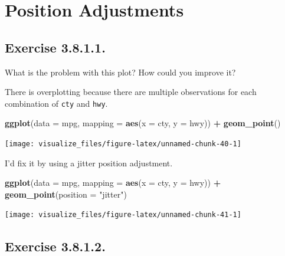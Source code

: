 \documentclass[]{book}
\newenvironment{Shaded}{\begin{snugshade}}{\end{snugshade}}
\newcommand{\DataTypeTok}[1]{\textcolor[rgb]{0.13,0.29,0.53}{#1}}
\newcommand{\KeywordTok}[1]{\textcolor[rgb]{0.13,0.29,0.53}{\textbf{#1}}}
\newcommand{\NormalTok}[1]{#1}
\newcommand{\OperatorTok}[1]{\textcolor[rgb]{0.81,0.36,0.00}{\textbf{#1}}}
\newcommand{\StringTok}[1]{\textcolor[rgb]{0.31,0.60,0.02}{#1}}
\theoremstyle{plain}
\theoremstyle{remark}
\begin{document}
\hypertarget{position-adjustments}{%
\section{Position Adjustments}\label{position-adjustments}}

\hypertarget{exercise-3.8.1.1.}{%
\subsection*{\texorpdfstring{Exercise {3.8.1.1}.}{Exercise 3.8.1.1.}}\label{exercise-3.8.1.1.}}

What is the problem with this plot?
How could you improve it?

There is overplotting because there are multiple observations for each combination of \texttt{cty} and \texttt{hwy}.

\begin{Shaded}
\begin{Highlighting}[]
\KeywordTok{ggplot}\NormalTok{(}\DataTypeTok{data =}\NormalTok{ mpg, }\DataTypeTok{mapping =} \KeywordTok{aes}\NormalTok{(}\DataTypeTok{x =}\NormalTok{ cty, }\DataTypeTok{y =}\NormalTok{ hwy)) }\OperatorTok{+}
\StringTok{  }\KeywordTok{geom_point}\NormalTok{()}
\end{Highlighting}
\end{Shaded}

\begin{center}\texttt{[image: visualize\_files/figure-latex/unnamed-chunk-40-1]} \end{center}

I'd fix it by using a jitter position adjustment.

\begin{Shaded}
\begin{Highlighting}[]
\KeywordTok{ggplot}\NormalTok{(}\DataTypeTok{data =}\NormalTok{ mpg, }\DataTypeTok{mapping =} \KeywordTok{aes}\NormalTok{(}\DataTypeTok{x =}\NormalTok{ cty, }\DataTypeTok{y =}\NormalTok{ hwy)) }\OperatorTok{+}
\StringTok{  }\KeywordTok{geom_point}\NormalTok{(}\DataTypeTok{position =} \StringTok{"jitter"}\NormalTok{)}
\end{Highlighting}
\end{Shaded}

\begin{center}\texttt{[image: visualize\_files/figure-latex/unnamed-chunk-41-1]} \end{center}

\hypertarget{exercise-3.8.1.2.}{%
\subsection*{\texorpdfstring{Exercise {3.8.1.2}.}{Exercise 3.8.1.2.}}\label{exercise-3.8.1.2.}}
\end{document}
